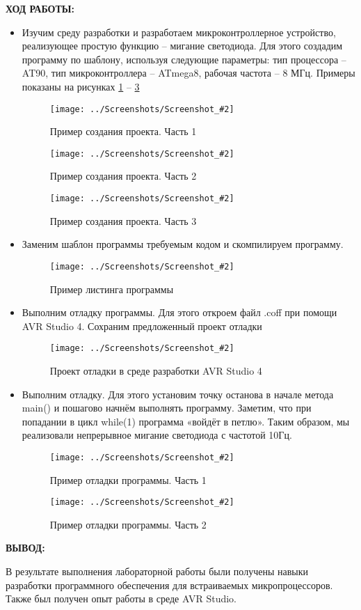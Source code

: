 \documentclass[14pt,a4paper]{extreport}
\newcommand{\sshot}[2]{\begin{figure}[ht]%
\centering\texttt{[image: ../Screenshots/Screenshot\_\#2]}%
\caption{#1}%
\label{sshot#2}%
\end{figure}%
}
\newcommand{\header}[1]{%
{
\clearpage%
\fontsize{16pt}{14pt}\selectfont
\begin{center}
\textbf{\MakeUppercase{#1}:}
\end{center}
}
}
\begin{document}
\header{Ход работы}

\begin{itemize}

\item Изучим среду разработки и разработаем микроконтроллерное устройство, реализующее простую функцию – мигание светодиода. Для этого создадим программу по шаблону, используя следующие параметры: тип процессора – AT90, тип микроконтроллера – ATmega8, рабочая частота – 8 МГц. Примеры показаны на рисунках \ref{sshot1} -- \ref{sshot3}

\sshot{Пример создания проекта. Часть 1}{1}
\sshot{Пример создания проекта. Часть 2}{2}
\sshot{Пример создания проекта. Часть 3}{3}

\clearpage

\item Заменим шаблон программы требуемым кодом и скомпилируем программу. 

\sshot{Пример листинга программы}{5}

\clearpage

\item Выполним отладку программы. Для этого откроем файл .coff при помощи AVR Studio 4. Сохраним предложенный проект отладки

\sshot{Проект отладки в среде разработки AVR Studio 4}{8}

\item Выполним отладку. Для этого установим точку останова в начале метода main() и пошагово начнём выполнять программу. Заметим, что при попадании в цикл while(1) программа «войдёт в петлю». Таким образом, мы реализовали непрерывное мигание светодиода с частотой 10Гц.

\sshot{Пример отладки программы. Часть 1}{9}

\sshot{Пример отладки программы. Часть 2}{10}

\end{itemize}

\header{Вывод}

	В результате выполнения лабораторной работы были получены навыки разработки программного обеспечения для встраиваемых микропроцессоров. Также был получен опыт работы в среде AVR Studio.
\end{document}
